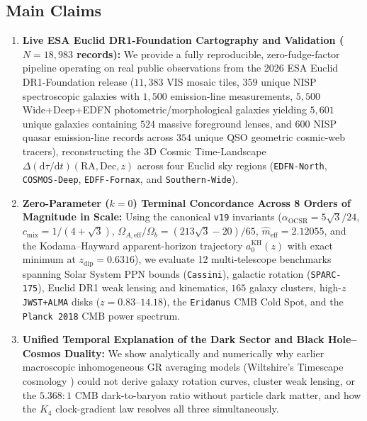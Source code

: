 \documentclass[11pt,a4paper]{article}
\begin{document}
\subsection{Main Claims}
\begin{enumerate}
  \item \textbf{Live ESA Euclid DR1-Foundation Cartography and Validation ($N = 18,983$ records):} We provide a fully reproducible, zero-fudge-factor pipeline operating on real public observations from the 2026 ESA Euclid DR1-Foundation release ($11,383$ VIS mosaic tiles, $359$ unique NISP spectroscopic galaxies with $1,500$ emission-line measurements, $5,500$ Wide+Deep+EDFN photometric/morphological galaxies yielding $5,601$ unique galaxies containing $524$ massive foreground lenses, and $600$ NISP quasar emission-line records across $354$ unique QSO geometric cosmic-web tracers), reconstructing the 3D Cosmic Time-Landscape $\Delta(\mathrm{d}\tau/\mathrm{d}t)(\mathrm{RA}, \mathrm{Dec}, z)$ across four Euclid sky regions (\texttt{EDFN-North}, \texttt{COSMOS-Deep}, \texttt{EDFF-Fornax}, and \texttt{Southern-Wide}).
  \item \textbf{Zero-Parameter ($k = 0$) Terminal Concordance Across 8 Orders of Magnitude in Scale:} Using the canonical \texttt{v19} invariants ($\alpha_{\mathrm{OCSR}} = 5\sqrt{3}/24$, $c_{\mathrm{mix}} = 1/(4+\sqrt{3})$, $\Omega_{A,\mathrm{eff}}/\Omega_b = (213\sqrt{3}-20)/65$, $\hat{m}_{\mathrm{eff}} = 2.12055$, and the Kodama--Hayward apparent-horizon trajectory $a_0^{\mathrm{KH}}(z)$ with exact minimum at $z_{\mathrm{dip}} = 0.6316$), we evaluate 12 multi-telescope benchmarks spanning Solar System PPN bounds (\texttt{Cassini}), galactic rotation (\texttt{SPARC-175}), Euclid DR1 weak lensing and kinematics, $165$ galaxy clusters, high-$z$ \texttt{JWST+ALMA} disks ($z = 0.83\text{--}14.18$), the \texttt{Eridanus} CMB Cold Spot, and the \texttt{Planck 2018} CMB power spectrum.
  \item \textbf{Unified Temporal Explanation of the Dark Sector and Black Hole--Cosmos Duality:} We show analytically and numerically why earlier macroscopic inhomogeneous GR averaging models (Wiltshire's Timescape cosmology \cite{Wiltshire2007Timescape}) could not derive galaxy rotation curves, cluster weak lensing, or the $5.368:1$ CMB dark-to-baryon ratio without particle dark matter, and how the $K_4$ clock-gradient law resolves all three simultaneously.
\end{enumerate}
\end{document}
